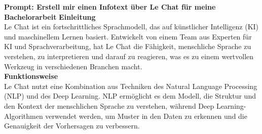 \begin{prompt}
    \begin{tcolorbox}[colback=gray!20, colframe=gray!20, boxrule=0pt, sharp corners] 
        \textbf{Prompt: Erstell mir einen Infotext über Le Chat für meine Bachelorarbeit}
        \textbf{Einleitung}\\
        Le Chat ist ein fortschrittliches Sprachmodell, das auf künstlicher Intelligenz (KI) und maschinellem Lernen 
        basiert. Entwickelt von einem Team aus Experten für KI und Sprachverarbeitung, hat Le Chat die Fähigkeit, 
        menschliche Sprache zu verstehen, zu interpretieren und darauf zu reagieren, was es zu einem wertvollen 
        Werkzeug in verschiedenen Branchen macht.\\

        \textbf{Funktionsweise}\\
        Le Chat nutzt eine Kombination aus Techniken des Natural Language Processing (NLP) und des Deep Learning. NLP 
        ermöglicht es dem Modell, die Struktur und den Kontext der menschlichen Sprache zu verstehen, während Deep 
        Learning-Algorithmen verwendet werden, um Muster in den Daten zu erkennen und die Genauigkeit der Vorhersagen 
        zu verbessern.\\


\end{tcolorbox}
\end{prompt}
